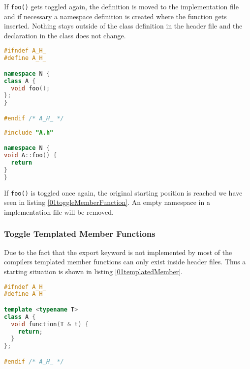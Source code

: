 If \texttt{foo()} gets toggled again, the definition is moved to the
implementation file and if necessary a namespace definition is created where
the function gets inserted. Nothing stays outside of the class definition in the
header file and the declaration in the class does not change.

\vspace{0.5cm}
\begin{minipage}{.48\textwidth}
\lstset{xrightmargin=0.5cm}
\begin{lstlisting}[caption={A.h, after moved definition},
label={03toggleMemberFunction}, language=C++]
#ifndef A_H_
#define A_H_

namespace N {
class A {
  void foo();
};
}

#endif /* A_H_ */
\end{lstlisting}
\end{minipage}%
\begin{minipage}{.48\textwidth}
\lstset{xleftmargin=0.5cm}
\begin{lstlisting}[caption={A.cpp with definition},
label={03_1toggleMemberFunction}, language=C++ ]
#include "A.h"

namespace N {
void A::foo() {
  return
}
}
\end{lstlisting}
\end{minipage}

If \texttt{foo()} is toggled once again, the original starting
position is reached we have seen in listing \ref{01toggleMemberFunction}. An
empty namespace in a implementation file will be removed.

\subsubsection{Toggle Templated Member Functions}
\label{templatedmember}

Due to the fact that the export keyword is not implemented by most of the
compilers templated member functions can only exist inside header files. Thus
a starting situation is shown in listing \ref{01templatedMember}.

\begin{lstlisting}[caption={A.h, in class definition with template parameters},
label={01templatedMember}, language=C++]
#ifndef A_H_
#define A_H_

template <typename T>
class A {
  void function(T & t) {
    return;
  }
};

#endif /* A_H_ */
\end{lstlisting}

